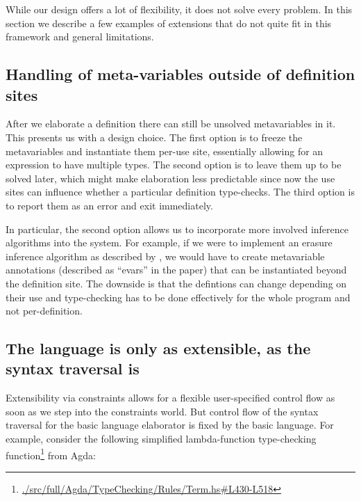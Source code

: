 \documentclass[
  sigconf,
  screen,
  review]{acmart}
\begin{document}
While our design offers a lot of flexibility, it does not solve every
problem. In this section we describe a few examples of extensions that
do not quite fit in this framework and general limitations.

\hypertarget{handling-of-meta-variables-outside-of-definition-sites}{%
\subsection{Handling of meta-variables outside of definition
sites}\label{handling-of-meta-variables-outside-of-definition-sites}}

After we elaborate a definition there can still be unsolved
metavariables in it. This presents us with a design choice. The first
option is to freeze the metavariables and instantiate them per-use site,
essentially allowing for an expression to have multiple types. The
second option is to leave them up to be solved later, which might make
elaboration less predictable since now the use sites can influence
whether a particular definition type-checks. The third option is to
report them as an error and exit immediately.

In particular, the second option allows us to incorporate more involved
inference algorithms into the system. For example, if we were to
implement an erasure inference algorithm as described by
\citet{tejiscakDependentlyTypedCalculus2020}, we would have to create
metavariable annotations (described as ``evars'' in the paper) that can
be instantiated beyond the definition site. The downside is that the
defintions can change depending on their use and type-checking has to be
done effectively for the whole program and not per-definition.

\hypertarget{the-language-is-only-as-extensible-as-the-syntax-traversal-is}{%
\subsection{The language is only as extensible, as the syntax traversal
is}\label{the-language-is-only-as-extensible-as-the-syntax-traversal-is}}

Extensibility via constraints allows for a flexible user-specified
control flow as soon as we step into the constraints world. But control
flow of the syntax traversal for the basic language elaborator is fixed
by the basic language. For example, consider the following simplified
lambda-function type-checking function\footnote{\href{https://github.com/agda/agda/blob/v2.6.4/src/full/Agda/TypeChecking/Rules/Term.hs\#L430-L518}{./src/full/Agda/TypeChecking/Rules/Term.hs\#L430-L518}}
from Agda:
\end{document}
